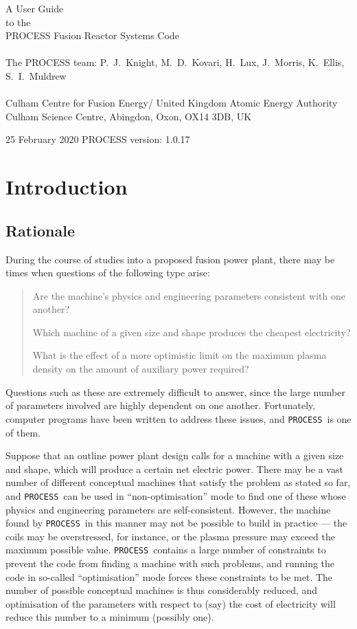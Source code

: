 \documentclass[11pt,a4paper]{report}
\newcommand{\process}{\mbox{\texttt{PROCESS}}}
\newcommand{\version}{
  25 February 2020
  \hfill
  PROCESS version: 1.0.17
}
\newcommand{\setheader}[1]
 {\markright{\rlap{\lower0.8ex\hbox to\textwidth{\hrulefill}}{\bf#1}}}
\newcommand{\mychapter}[1]{\small\normalsize
 \setcounter{footnote}{0}
 \chapter{#1}
 \pagestyle{myheadings}
 \setheader{Chapter \thechapter\hspace{0.8em}#1}}
\begin{document}
\footnotesize
\hfill

\vspace*{4cm}
\begin{center}
\Huge A User Guide\\ to the \\ PROCESS Fusion Reactor Systems Code\\
~\\ \LARGE The PROCESS team: P.\ J.\ Knight, M.\ D.\ Kovari, H.\ Lux, J.\ Morris, K.\ Ellis, S.\ I.\ Muldrew\\
~\\ \Large Culham Centre for Fusion Energy/ United Kingdom Atomic Energy Authority\\
Culham Science Centre, Abingdon, Oxon, OX14 3DB, UK
\end{center}

\vfill
\footnotesize
\version
\normalsize

\tableofcontents

\listoffigures

\listoftables

\mychapter{Introduction}
\label{chap:intro}

\section{Rationale}

During the course of studies into a proposed fusion power plant, there may be
times when questions of the following type arise:
\begin{quote}
Are the machine's physics and engineering parameters consistent with one
another?

Which machine of a given size and shape produces the cheapest electricity?

What is the effect of a more optimistic limit on the maximum plasma density on
the amount of auxiliary power required?
\end{quote}

Questions such as these are extremely difficult to answer, since the large
number of parameters involved are highly dependent on one another.
Fortunately, computer programs have been written to address these issues, and
\process\ is one of them.

Suppose that an outline power plant design calls for a machine with a given
size and shape, which will produce a certain net electric power.  There may be
a vast number of different conceptual machines that satisfy the problem as
stated so far, and \process\ can be used in ``non-optimisation'' mode to find
one of these whose physics and engineering parameters are
self-consistent. However, the machine found by \process\ in this manner may
not be possible to build in practice --- the coils may be overstressed, for
instance, or the plasma pressure may exceed the maximum possible
value. \process\ contains a large number of constraints to prevent the code
from finding a machine with such problems, and running the code in so-called
``optimisation'' mode forces these constraints to be met. The number of
possible conceptual machines is thus considerably reduced, and optimisation of
the parameters with respect to (say) the cost of electricity will reduce this
number to a minimum (possibly one).
\end{document}
